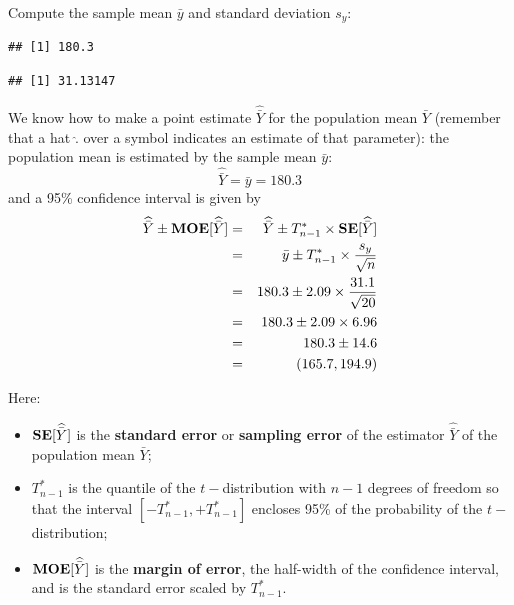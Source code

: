 \documentclass[
]{book}
\newenvironment{Shaded}{\begin{snugshade}}{\end{snugshade}}
\newcommand{\FunctionTok}[1]{\textcolor[rgb]{0.13,0.29,0.53}{\textbf{#1}}}
\newcommand{\NormalTok}[1]{#1}
\newcommand{\OtherTok}[1]{\textcolor[rgb]{0.56,0.35,0.01}{#1}}
\newcommand{\SpecialCharTok}[1]{\textcolor[rgb]{0.81,0.36,0.00}{\textbf{#1}}}
\providecommand{\tightlist}{%
  \setlength{\itemsep}{0pt}\setlength{\parskip}{0pt}}
\newcommand{\bfa}[2]{{\rm\bf #1}[#2]}
\begin{document}
Compute the sample mean \(\bar{y}\) and standard deviation \(s_y\):

\begin{Shaded}
\end{Shaded}

\begin{verbatim}
## [1] 180.3
\end{verbatim}

\begin{Shaded}
\end{Shaded}

\begin{verbatim}
## [1] 31.13147
\end{verbatim}

We know how to make a point estimate \(\widehat{\bar{Y}}\) for the population
mean \(\bar{Y}\) (remember that a hat \(\widehat{.}\) over a symbol indicates
an estimate of that parameter): the population mean is estimated by the sample
mean \(\bar{y}\):
\[
    \widehat{\bar{Y}} = \bar{y} = 180.3
\]
and a 95\% confidence interval is given by
\begin{eqnarray}
    \widehat{\bar{Y}} \pm \bfa{MOE}{\widehat{\bar{Y}}}
    &=& \widehat{\bar{Y}} \pm T^\ast_{n-1}\times \bfa{SE}{\widehat{\bar{Y}}}\\
    &=&  \bar{y} \pm T^\ast_{n-1}\times\frac{s_y}{\sqrt{n}}\\
    &=& 
    180.3 \pm 2.09 \times \frac{31.1}{\sqrt{20}}\\
    &=& 
    180.3 \pm 2.09 \times 6.96\\
    &=& 
    180.3 \pm 14.6\\
    &=& 
    (165.7,194.9)
\end{eqnarray}

Here:

\begin{itemize}
\tightlist
\item
  \(\bfa{SE}{\widehat{\bar{Y}}}\) is the \textbf{standard error} or \textbf{sampling error} of the
  estimator \(\widehat{\bar{Y}}\) of the population mean \(\bar{Y}\);
\item
  \(T^\ast_{n-1}\) is the quantile of the \(t-\)distribution with \(n-1\) degrees of
  freedom so that the interval \([-T^\ast_{n-1},+T^\ast_{n-1}]\) encloses 95\% of the probability
  of the \(t-\)distribution;
\item
  \(\bfa{MOE}{\widehat{\bar{Y}}}\) is the \textbf{margin of error}, the half-width of the confidence interval,
  and is the standard error scaled by \(T^\ast_{n-1}\).
\end{itemize}
\end{document}
